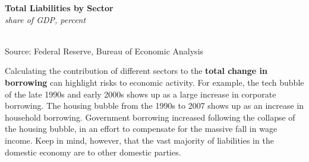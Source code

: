 \documentclass{report}
\makeatletter
\newcommand{\tbllink}[1]{\href{https://raw.githubusercontent.com/bdecon/US-chartbook/master/chartbook/data/#1}{\faTable}}
\newcommand*\short[1]{\expandafter\@gobbletwo\number\numexpr#1\relax}
\newcommand{\absnode}[3]{\node[below right, align=left] at (axis cs: #1,#2) {#3};}
\newcommand{\dateaxisticks}{
		date coordinates in=x, axis line style={draw=none},
		xmax={2022-03-15},
		max space between ticks=40,	    
		xtick={{1990-01-01}, {1992-01-01}, {1994-01-01}, 
			{1996-01-01}, {1998-01-01}, {2000-01-01}, 
			{2002-01-01}, {2004-01-01}, {2006-01-01},
			{2008-01-01}, {2010-01-01}, {2012-01-01}, {2014-01-01},
		    {2016-01-01}, {2018-01-01}, {2020-01-01}, {2022-01-01}, 
		    {2024-01-01}, {2026-01-01}},
		minor xtick={{1989-01-01}, {1991-01-01}, {1993-01-01},
			{1995-01-01}, {1997-01-01}, {1999-01-01}, 
			{2001-01-01}, {2003-01-01}, {2005-01-01}, {2007-01-01},
		    {2009-01-01}, {2011-01-01}, {2013-01-01}, {2015-01-01},
		    {2017-01-01}, {2019-01-01}, {2021-01-01}, {2023-01-01}, 
		    {2025-01-01}, {2027-01-01}},
		enlarge y limits={0.06}, enlarge x limits={0.01},
		}
\newcommand{\bbar}[2]{extra #1 ticks = {{#2}}, extra #1 tick labels = ,
		extra #1 tick style = {grid=major, grid style={thick, black!25}},}
\newcommand{\thickline}[4]{\addplot[ultra thick, no markers, color=#1] 
		table [x=#2, y=#3, col sep=comma] {#4};	}
\newcommand{\rbars}{
		\fill[color=black!10] (axis cs:{1990-07-01},\pgfkeysvalueof{/pgfplots/ymin}) rectangle 
			(axis cs:{1991-03-01}, \pgfkeysvalueof{/pgfplots/ymax});
		\fill[color=black!10] (axis cs:{2007-12-01},\pgfkeysvalueof{/pgfplots/ymin}) rectangle 
			(axis cs:{2009-07-01}, \pgfkeysvalueof{/pgfplots/ymax});
		\fill[color=black!10] (axis cs:{2001-03-01},\pgfkeysvalueof{/pgfplots/ymin}) rectangle 
			(axis cs:{2001-11-01}, \pgfkeysvalueof{/pgfplots/ymax});
		\fill[color=black!10] (axis cs:{2020-02-01},\pgfkeysvalueof{/pgfplots/ymin}) rectangle 
			(axis cs:{2020-05-01}, \pgfkeysvalueof{/pgfplots/ymax});}
\makeatother
\begin{document}
{\begin{minipage}{0.76\textwidth}
\normalsize \textbf{Total Liabilities by Sector}\\
\footnotesize{\textit{share of GDP, percent}}\\
\hspace*{-2mm} \\
\footnotesize{Source: Federal Reserve, Bureau of Economic Analysis}  \hfill \tbllink{liabsh.csv}
\end{minipage}
\newpage
\begin{minipage}{0.76\textwidth}
\small Calculating the contribution of different sectors to the \textbf{total change in borrowing} can highlight risks to economic activity. For example, the tech bubble of the late 1990s and early 2000s shows up as a large increase in corporate borrowing. The housing bubble from the 1990s to 2007 shows up as an increase in household borrowing. Government borrowing increased following the collapse of the housing bubble, in an effort to compensate for the massive fall in wage income. Keep in mind, however, that the vast majority of liabilities in the domestic economy are to other domestic parties.

 
\vspace{2mm}


\end{minipage}}
\end{document}
